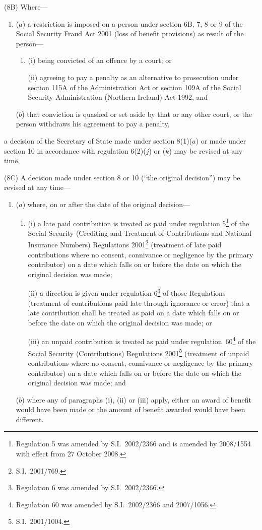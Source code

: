 \documentclass[12pt,a4paper]{article}
\begin{document}
(8B) Where—
\begin{enumerate}\item[]
($a$) a restriction is imposed on a person under section 6B, 7, 8 or 9 of the Social Security Fraud Act 2001 (loss of benefit provisions) as result of the person—
\begin{enumerate}\item[]
(i) being convicted of an offence by a court; or

(ii) agreeing to pay a penalty as an alternative to prosecution under section 115A of the Administration Act or section 109A of the Social Security Administration (Northern Ireland) Act 1992, and
\end{enumerate}

($b$) that conviction is quashed or set aside by that or any other court, or the person withdraws his agreement to pay a penalty,
\end{enumerate}
a decision of the Secretary of State made under section 8(1)($a$) or made under section 10 in accordance with regulation 6(2)($j$) or ($k$) may be revised at any time.

(8C) A decision made under section 8 or 10 (“the original decision”) may be revised at any time—
\begin{enumerate}\item[]
($a$) where, on or after the date of the original decision—
\begin{enumerate}\item[]
(i) a late paid contribution is treated as paid under regulation 5\footnote{Regulation 5 was amended by S.I.~2002/2366 and is amended by 2008/1554 with effect from 27 October 2008.} of the Social Security (Crediting and Treatment of Contributions and National Insurance Numbers) Regulations 2001\footnote{S.I.~2001/769.} (treatment of late paid contributions where no consent, connivance or negligence by the primary contributor) on a date which falls on or before the date on which the original decision was made;

(ii) a direction is given under regulation 6\footnote{Regulation 6 was amended by S.I.~2002/2366.} of those Regulations (treatment of contributions paid late through ignorance or error) that a late contribution shall be treated as paid on a date which falls on or before the date on which the original decision was made; or

(iii) an unpaid contribution is treated as paid under regulation~60\footnote{Regulation 60 was amended by S.I.~2002/2366 and 2007/1056.} of the Social Security (Contributions) Regulations 2001\footnote{S.I.~2001/1004.} (treatment of unpaid contributions where no consent, connivance or negligence by the primary contributor) on a date which falls on or before the date on which the original decision was made; and
\end{enumerate}

($b$) where any of paragraphs (i), (ii) or (iii) apply, either an award of benefit would have been made or the amount of benefit awarded would have been different.
\end{enumerate}
\end{document}
